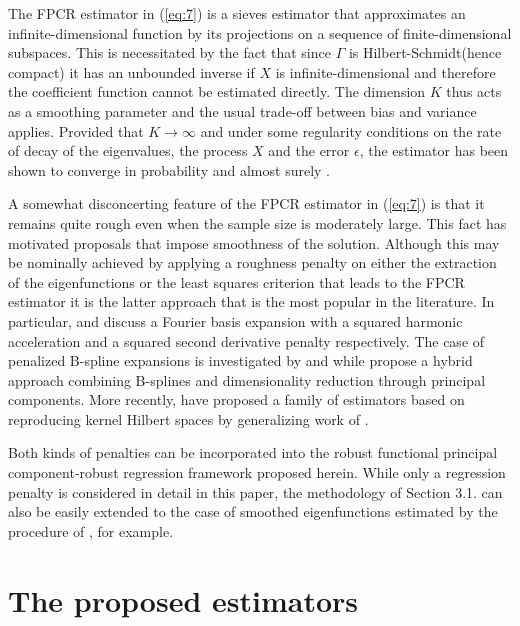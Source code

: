 \documentclass[11pt]{article}
\begin{document}
The FPCR estimator in (\ref{eq:7}) is a sieves estimator that approximates an infinite-dimensional function by its projections on a sequence of finite-dimensional subspaces. This is necessitated by the fact that since $\Gamma$ is Hilbert-Schmidt(hence compact) it has an unbounded inverse if $X$ is infinite-dimensional and therefore the coefficient function cannot be estimated directly. The dimension $K$ thus acts as a smoothing parameter and the usual trade-off between bias and variance applies. Provided that $K \to \infty$ and under some regularity conditions on the rate of decay of the eigenvalues, the process $X$ and the error $\epsilon$, the estimator has been shown to converge in probability and almost surely \citep{cardot1999functional, hall2007methodology}.	

A somewhat disconcerting feature of the FPCR estimator in (\ref{eq:7}) is that it remains quite rough even when the sample size is moderately large. This fact has motivated proposals that impose smoothness of the solution. Although this may be nominally achieved by applying a roughness penalty on either the extraction of the eigenfunctions or the least squares criterion that leads to the FPCR estimator it is the latter approach that is the most popular in the literature. In particular, \citet{ramsay2006functional} and \citet{li2007rates} discuss a Fourier basis expansion with a squared harmonic acceleration and a squared second derivative penalty respectively. The case of penalized B-spline expansions is investigated by \citet{cardot2003spline} and \citet{crambes2009smoothing} while \citet{reiss2007functional} propose a hybrid approach combining B-splines and dimensionality reduction through principal components. More recently, \citet{shin2016rkhs} have proposed a family of estimators based on reproducing kernel Hilbert spaces by generalizing work of \citet{yuan2010reproducing}. 

Both kinds of penalties can be incorporated into the robust functional principal component-robust regression framework proposed herein. While only a regression penalty is considered in detail in this paper, the methodology of Section 3.1. can also be easily extended to the case of smoothed eigenfunctions estimated by the procedure of \cite{bali2011robust}, for example.

\section{The proposed estimators}
\end{document}
